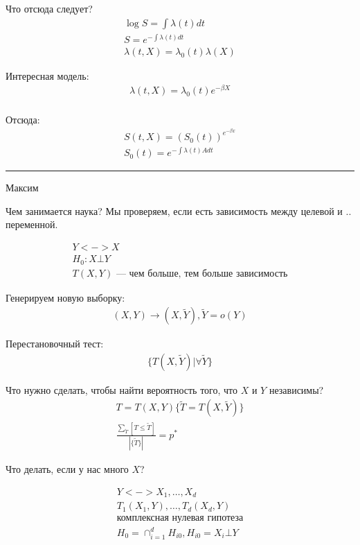 \documentclass{book}
\begin{document}
Что отсюда следует?
\begin{gather*}
  \log S = \int {\lambda(t)dt} \\
  S=e^{-\int {\lambda(t)dt}}\\
  \lambda(t,X)=\lambda_0(t)\lambda(X)
\end{gather*}

Интересная модель:
\begin{gather*}
  \lambda(t,X)=\lambda_0(t)e^{-\beta X}\\
\end{gather*}

Отсюда:
\begin{gather*}
  S(t,X)=\left(S_0(t)\right)^{e^{-\beta x}}\\
  S_0(t)=e^{-\int {\lambda(t)Adt}}
\end{gather*}

\hrule
Максим

Чем занимается наука? Мы проверяем, если есть зависимость между целевой и .. переменной.

\begin{gather*}
  Y <-> X\\
  H_0:X \bot Y\\
  T(X,Y) \textrm{ --- чем больше, тем больше зависимость}
\end{gather*}

Генерируем новую выборку:
\begin{gather*}
  (X,Y) \rightarrow (X, \tilde{Y}), \tilde{Y}=o(Y)
\end{gather*}

Перестановочный тест:
\begin{gather*}
  \{T(X, \tilde{Y}) | \forall \tilde{Y}\}
\end{gather*}

Что нужно сделать, чтобы найти вероятность того, что $X$ и $Y$ независимы?
\begin{gather*}
  T=T(X,Y) \{\tilde{T}=T(X,\tilde{Y})\}\\
  \frac{\sum_{\tilde{T}} {[T\leq \tilde{T}]} {}}{|\{\tilde{T}\}|}=p^*
\end{gather*}

Что делать, если у нас много $X$?

\begin{gather*}
  Y <-> X_1,\dots,X_d\\
  T_1(X_1,Y), \dots, T_d(X_d,Y)\\
  \textrm{комплексная нулевая гипотеза}\\
  H_0=\cap_{i=1}^d H_{i0}, H_{i0}=X_i\bot Y
\end{gather*}
\end{document}
